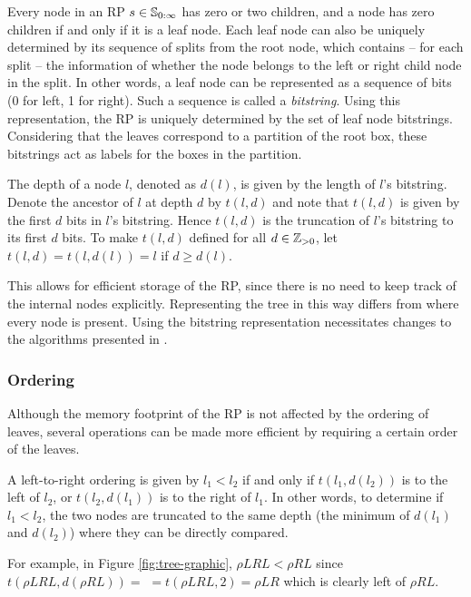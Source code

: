 \documentclass[../regular-pavings.tex]{subfiles}
\begin{document}
  
  Every node in an RP $s \in \mathbb{S}_{0:\infty}$ has zero or two children, and 
  a node has zero children if and only if it is a leaf node.
  Each leaf node can also be uniquely determined by its sequence of splits from the root node, 
  which contains -- for each split -- the information of whether the node belongs to 
  the left or right child node in the split.
  In other words, a leaf node can be represented as a sequence of bits (0 for left, 1 for right).
  Such a sequence is called a \textit{bitstring}.
  Using this representation, the RP is uniquely determined by the set of leaf node bitstrings.
  Considering that the leaves correspond to a partition of the root box, 
  these bitstrings act as labels for the boxes in the partition.

  The depth of a node $l$, denoted as $d(l)$, is given by the length of $l$'s bitstring.
  Denote the ancestor of $l$ at depth $d$ by $t(l, d)$ and 
  note that $t(l, d)$ is given by the first $d$ bits in $l$'s bitstring.
  Hence $t(l, d)$ is the truncation of $l$'s bitstring to its first $d$ bits.
  To make $t(l, d)$ defined for all $d \in \mathbb{Z}_{>0}$, let $t(l, d) = t(l, d(l)) = l$ if $d \ge d(l)$.

  This allows for efficient storage of the RP, 
  since there is no need to keep track of the internal nodes explicitly.
  Representing the tree in this way differs from \cite{mrp-raaz-harlow-tucker} 
  where every node is present.
  Using the bitstring representation necessitates changes to 
  the algorithms presented in \cite{mrp-raaz-harlow-tucker}.
  
  \subsubsection{Ordering}
  Although the memory footprint of the RP is not affected by the ordering of leaves,
  several operations can be made more efficient by requiring a certain order of the leaves.

  A left-to-right ordering is given by $l_1 < l_2$ if and only if $t(l_1, d(l_2))$ is 
  to the left of $l_2$, or $t(l_2, d(l_1))$ is to the right of $l_1$.
  In other words, to determine if $l_1 < l_2$, the two nodes are truncated to the same depth 
  (the minimum of $d(l_1)$ and $d(l_2)$) where they can be directly compared.

  For example, in Figure \ref{fig:tree-graphic}, $\rho LRL < \rho RL$ since $t(\rho LRL, d(\rho RL)) =$ \linebreak $= t(\rho LRL, 2) = \rho LR$ which is clearly left of $\rho RL$.
\end{document}
